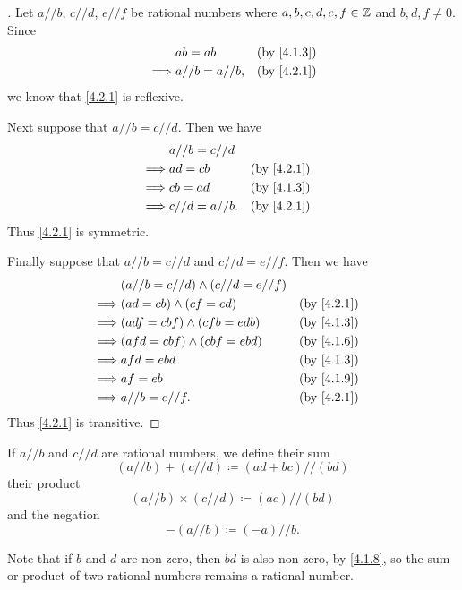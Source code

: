 \begin{proof}[]
  Let \(a // b\), \(c // d\), \(e // f\) be rational numbers where \(a, b, c, d, e, f \in \mathbb{Z}\) and \(b, d, f \neq 0\).
  Since
  \begin{align*}
             & ab = ab          &  & \by{4.1.3} \\
    \implies & a // b = a // b, &  & \by{4.2.1}
  \end{align*}
  we know that \cref{4.2.1} is reflexive.

  Next suppose that \(a // b = c // d\).
  Then we have
  \begin{align*}
             & a // b = c // d                  \\
    \implies & ad = cb          &  & \by{4.2.1} \\
    \implies & cb = ad          &  & \by{4.1.3} \\
    \implies & c // d = a // b. &  & \by{4.2.1}
  \end{align*}
  Thus \cref{4.2.1} is symmetric.

  Finally suppose that \(a // b = c // d\) and \(c // d = e // f\).
  Then we have
  \begin{align*}
             & (a // b = c // d) \land (c // d = e // f)                 \\
    \implies & (ad = cb) \land (cf = ed)                 &  & \by{4.2.1} \\
    \implies & (adf = cbf) \land (cfb = edb)             &  & \by{4.1.3} \\
    \implies & (afd = cbf) \land (cbf = ebd)             &  & \by{4.1.6} \\
    \implies & afd = ebd                                 &  & \by{4.1.3} \\
    \implies & af = eb                                   &  & \by{4.1.9} \\
    \implies & a // b = e // f.                          &  & \by{4.2.1}
  \end{align*}
  Thus \cref{4.2.1} is transitive.
\end{proof}

\begin{defn}\label{4.2.2}
  If \(a // b\) and \(c // d\) are rational numbers, we define their sum
  \[
    (a // b) + (c // d) \coloneqq (ad + bc) // (bd)
  \]
  their product
  \[
    (a // b) \times (c // d) \coloneqq (ac) // (bd)
  \]
  and the negation
  \[
    -(a // b) \coloneqq (-a) // b.
  \]

  Note that if \(b\) and \(d\) are non-zero, then \(bd\) is also non-zero, by \cref{4.1.8}, so the sum or product of two rational numbers remains a rational number.
\end{defn}

